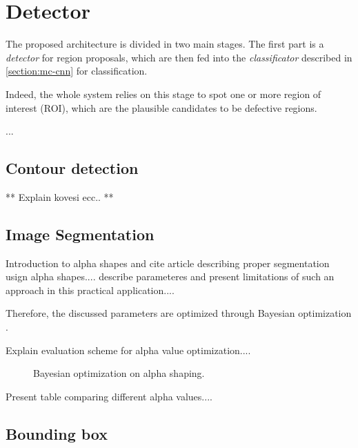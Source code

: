 \section{Detector}\label{section:region_proposals}
    \par{
        The proposed architecture is divided in two main stages. The first part is a \emph{detector} for region proposals, which are then fed into the \emph{classificator} described in \ref{section:mc-cnn} for classification.
    }
    \par{
        Indeed, the whole system relies on this stage to spot one or more region of interest (ROI), which are the plausible candidates to be defective regions.
    }
    \par{
        ...
    }
    \subsection{Contour detection}\label{subsection:contour_detection}
        \par{
            ** Explain kovesi ecc.. **
        }
    \subsection{Image Segmentation}\label{subsection:segmentation}
        \par{
            Introduction to alpha shapes and cite article describing proper segmentation usign alpha shapes.... describe parameteres and present limitations of such an approach in this practical application....
        }
        \par{
            Therefore, the discussed parameters are optimized through Bayesian optimization \cite{arXiv:2012arXiv1206.2944S,arXiv:2018arXiv180702811F}.
        }
        \par{
            Explain evaluation scheme for alpha value optimization....
        }
        \begin{figure}
            \caption{Bayesian optimization on alpha shaping.}\label{fig:alpha-shape-optimization}
        \end{figure}
        \par{
            Present table comparing different alpha values....
        }
    \subsection{Bounding box}\label{subsection:bounding_box}
        \par{

        }


